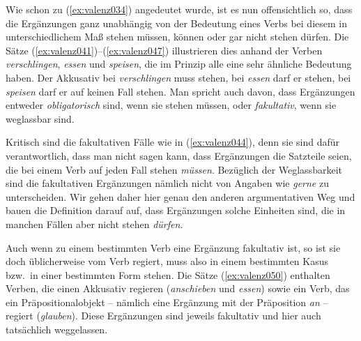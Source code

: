 Wie schon zu (\ref{ex:valenz034}) angedeutet wurde, ist es nun offensichtlich so, dass die Ergänzungen ganz unabhängig von der Bedeutung eines Verbs bei diesem in unterschiedlichem Maß stehen müssen, können oder gar nicht stehen dürfen.
Die Sätze (\ref{ex:valenz041})--(\ref{ex:valenz047}) illustrieren dies anhand der Verben \textit{verschlingen}, \textit{essen} und \textit{speisen}, die im Prinzip alle eine sehr ähnliche Bedeutung haben.
Der Akkusativ bei \textit{verschlingen} muss stehen, bei \textit{essen} darf er stehen, bei \textit{speisen} darf er auf keinen Fall stehen.
Man spricht auch davon, dass Ergänzungen entweder \textit{obligatorisch} sind, wenn sie stehen müssen, oder \textit{fakultativ}, wenn sie weglassbar sind.

\begin{exe}
  \ex\label{ex:valenz041}
  \begin{xlist}
  \end{xlist}
  \ex\label{ex:valenz044}
  \begin{xlist}
  \end{xlist}
  \ex\label{ex:valenz047}
  \begin{xlist}
  \end{xlist}
\end{exe}

Kritisch sind die fakultativen Fälle wie in (\ref{ex:valenz044}), denn sie sind dafür verantwortlich, dass man nicht sagen kann, dass Ergänzungen die Satzteile seien, die bei einem Verb auf jeden Fall stehen \textit{müssen}.
Bezüglich der Weglassbarkeit sind die fakultativen Ergänzungen nämlich nicht von Angaben wie \textit{gerne} zu unterscheiden.
Wir gehen daher hier genau den anderen argumentativen Weg und bauen die Definition darauf auf, dass Ergänzungen solche Einheiten sind, die in manchen Fällen aber nicht stehen \textit{dürfen}.

Auch wenn zu einem bestimmten Verb eine Ergänzung fakultativ ist, so ist sie doch üblicherweise vom Verb regiert, muss also in einem bestimmten Kasus bzw.\ in einer bestimmten Form stehen.
Die Sätze (\ref{ex:valenz050}) enthalten Verben, die einen Akkusativ regieren (\textit{anschieben} und \textit{essen}) sowie ein Verb, das ein Präpositionalobjekt -- nämlich eine Ergänzung mit der Präposition \textit{an} -- regiert (\textit{glauben}).
Diese Ergänzungen sind jeweils fakultativ und hier auch tatsächlich weggelassen.

